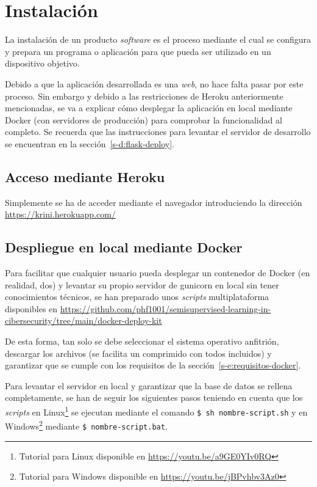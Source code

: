 \section{Instalación}

La instalación de un producto \textit{software} es el proceso mediante el cual se configura y prepara un programa o aplicación para que pueda ser utilizado en un dispositivo objetivo.

Debido a que la aplicación desarrollada es una \textit{web}, no hace falta pasar por este proceso. Sin embargo y debido a las restricciones de Heroku anteriormente mencionadas, se va a explicar cómo desplegar la aplicación en local mediante Docker (con servidores de producción) para comprobar la funcionalidad al completo. Se recuerda que las instrucciones para levantar el servidor de desarrollo se encuentran en la sección~\ref{s-d:flask-deploy}.

\subsection{Acceso mediante Heroku}

Simplemente se ha de acceder mediante el navegador introduciendo la dirección \url{https://krini.herokuapp.com/}

\subsection{Despliegue en local mediante Docker}
\label{s-e:docker-deploy-users}

Para facilitar que cualquier usuario pueda desplegar un contenedor de Docker (en realidad, dos) y levantar su propio servidor de gunicorn en local sin tener conocimientos técnicos, se han preparado unos \textit{scripts} multiplataforma disponibles en \url{https://github.com/phf1001/semisupervised-learning-in-cibersecurity/tree/main/docker-deploy-kit}

De esta forma, tan solo se debe seleccionar el sistema operativo anfitrión, descargar los archivos (se facilita un comprimido con todos incluidos) y garantizar que se cumple con los requisitos de la sección~\ref{s-e:requisitos-docker}.

Para levantar el servidor en local y garantizar que la base de datos se rellena completamente, se han de seguir los siguientes pasos teniendo en cuenta que los \textit{scripts} en Linux\footnote{Tutorial para Linux disponible en \url{https://youtu.be/a9GE0YIv0RQ}} se ejecutan mediante el comando \texttt{\$ sh nombre-script.sh} y en Windows\footnote{Tutorial para Windows disponible en \url{https://youtu.be/jBPvhbv3Az0}} mediante \texttt{\$ nombre-script.bat}.

